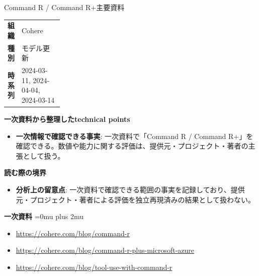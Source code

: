 \begin{technicalnote}{Command R / Command R+}{主要資料}
\begingroup
\begin{tabularx}{\linewidth}{@{}>{\bfseries}p{0.22\linewidth}X@{}}
組織 & Cohere \\
種別 & モデル更新 \\
時系列 & 2024-03-11, 2024-04-04, 2024-03-14 \\
\end{tabularx}
\smallskip
{\bfseries 一次資料から整理したtechnical points}
\begin{itemize}[leftmargin=1.5em,itemsep=0.35em]
\item \textbf{一次情報で確認できる事実}: 一次資料で「Command R / Command R+」を確認できる。数値や能力に関する評価は、提供元・プロジェクト・著者の主張として扱う。
\end{itemize}
\begin{minipage}{\linewidth}
{\bfseries 読む際の境界}
\begin{itemize}[leftmargin=1.5em,itemsep=0.35em]
\item \textbf{分析上の留意点}: 一次資料で確認できる範囲の事実を記録しており、提供元・プロジェクト・著者による評価を独立再現済みの結果として扱わない。
\end{itemize}
\begin{samepage}
{\bfseries 一次資料}
\begingroup\sloppy
\Urlmuskip=0mu plus 2mu\relax
\begin{itemize}[leftmargin=1.5em,itemsep=0.25em]
\item {\scriptsize\url{https://cohere.com/blog/command-r}}
\item {\scriptsize\url{https://cohere.com/blog/command-r-plus-microsoft-azure}}
\item {\scriptsize\url{https://cohere.com/blog/tool-use-with-command-r}}
\end{itemize}
\endgroup
\end{samepage}
\end{minipage}
\endgroup
\end{technicalnote}
\medskip

